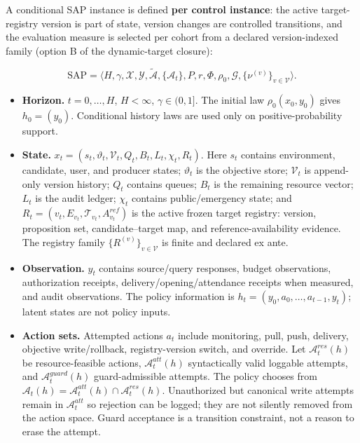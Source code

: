 \documentclass[
  11pt]{article}
\providecommand{\tightlist}{%
  \setlength{\itemsep}{0pt}\setlength{\parskip}{0pt}}
\begin{document}
A conditional SAP instance is defined \textbf{per control instance}: the
active target-registry version is part of state, version changes are
controlled transitions, and the evaluation measure is selected per
cohort from a declared version-indexed family (option B of the
dynamic-target closure):

\[\mathrm{SAP}=\langle H,\gamma,\mathcal X,\mathcal Y,\widetilde{\mathcal A},\{\mathcal A_t\},P,r,\Phi,\rho_0,\mathcal G,\{\nu^{(v)}\}_{v\in\mathcal V}\rangle.\tag{1}\]

\begin{itemize}
\tightlist
\item
  \textbf{Horizon.} \(t=0,\ldots,H\), \(H<\infty\), \(\gamma\in(0,1]\).
  The initial law \(\rho_0(x_0,y_0)\) gives \(h_0=(y_0)\). Conditional
  history laws are used only on positive-probability support.
\item
  \textbf{State.}
  \(x_t=(s_t,\vartheta_t,\mathcal V_t,Q_t,B_t,L_t,\chi_t,R_t)\). Here
  \(s_t\) contains environment, candidate, user, and producer states;
  \(\vartheta_t\) is the objective store; \(\mathcal V_t\) is
  append-only version history; \(Q_t\) contains queues; \(B_t\) is the
  remaining resource vector; \(L_t\) is the audit ledger; \(\chi_t\)
  contains public/emergency state; and
  \(R_t=(v_t,E_{v_t},\mathcal T_{v_t},A^{ref}_{v_t})\) is the active
  frozen target registry: version, proposition set, candidate--target
  map, and reference-availability evidence. The registry family
  \(\{R^{(v)}\}_{v\in\mathcal V}\) is finite and declared ex ante.
\item
  \textbf{Observation.} \(y_t\) contains source/query responses, budget
  observations, authorization receipts, delivery/opening/attendance
  receipts when measured, and audit observations. The policy information
  is \(h_t=(y_0,a_0,\ldots,a_{t-1},y_t)\); latent states are not policy
  inputs.
\item
  \textbf{Action sets.} Attempted actions \(a_t\) include monitoring,
  pull, push, delivery, objective write/rollback, registry-version
  switch, and override. Let \(\mathcal A^{res}_t(h)\) be
  resource-feasible actions, \(\mathcal A^{att}_t(h)\) syntactically
  valid loggable attempts, and \(\mathcal A^{guard}_t(h)\)
  guard-admissible attempts. The policy chooses from
  \(\mathcal A_t(h)=\mathcal A^{att}_t(h)\cap\mathcal A^{res}_t(h)\).
  Unauthorized but canonical write attempts remain in
  \(\mathcal A^{att}_t\) so rejection can be logged; they are not
  silently removed from the action space. Guard acceptance is a
  transition constraint, not a reason to erase the attempt.

\end{itemize}
\end{document}
